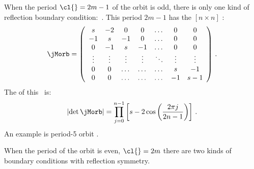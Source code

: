 \begin{description}
When the period $\cl{}=2m-1$  of the orbit is odd,
there is only one kind of reflection boundary condition:
\beq
{}
\,.
\label{HLreflectionSymOdd}
\eeq
This period $2m-1$ {\lattstate} has
the $[n \times n]$ \jacobianOrb:
\[
{\jMorb}
  =
\left(\begin{array}{ccccccc}
 s& -2 & 0 & 0 &\dots &0& 0 \\
 -1 &  s& -1 & 0 &\dots &0&0 \\
0 & -1 &  s & -1 &\dots &0 & 0 \\
\vdots & \vdots &\vdots & \vdots & \ddots &\vdots &\vdots\\
0 & 0 & \dots &\dots &\dots  & s & -1 \\
0 & 0 & \dots &  \dots &\dots& -1 &  s-1
        \end{array} \right)
\,.
\]
The {\HillDet} of this \jacobianOrb\ is:
\[
\left|\det{\jMorb}\right|
=
\prod_{j=0}^{n-1} \left[s-2\cos\left(\frac{2 \pi j}{2n-1}\right)\right] \,.
\]
An example is period-5 orbit .


When the period of the orbit is even, $\cl{}=2m$
there are two kinds of boundary conditions with reflection symmetry.


\end{description}

